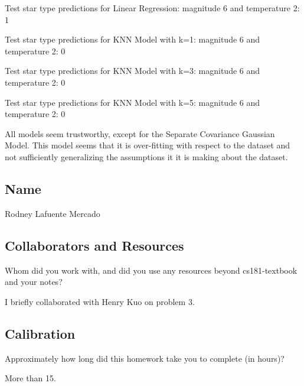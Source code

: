 \documentclass[submit]{harvardml}
\begin{document}
\begin{enumerate}
Test star type predictions for Linear Regression:
magnitude 6 and temperature 2: 1

Test star type predictions for KNN Model with k=1:
magnitude 6 and temperature 2: 0

Test star type predictions for KNN Model with k=3:
magnitude 6 and temperature 2: 0

Test star type predictions for KNN Model with k=5:
magnitude 6 and temperature 2: 0

All models seem trustworthy, except for the Separate Covariance Gaussian
Model. This model seems that it is over-fitting with respect to 
the dataset and not sufficiently generalizing the assumptions it 
it is making about the dataset.

\end{enumerate}

\newpage
\subsection*{Name}
Rodney Lafuente Mercado

\subsection*{Collaborators and Resources}
Whom did you work with, and did you use any resources beyond cs181-textbook and your notes?

I briefly collaborated with Henry Kuo on problem 3. 
\subsection*{Calibration}
Approximately how long did this homework take you to complete (in hours)?

More than 15.
\end{document}
